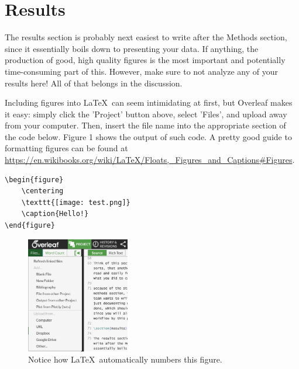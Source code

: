 \documentclass[10pt, letterpaper]{article}
\begin{document}
\section{Results}
The results section is probably next easiest to write after the Methods section, since it essentially boils down to presenting your data. If anything, the production of good, high quality figures is the most important and potentially time-consuming part of this. However, make sure to not analyze any of your results here! All of that belongs in the discussion.

Including figures into \LaTeX\ can seem intimidating at first, but Overleaf makes it easy: simply click the 'Project' button above, select 'Files', and upload away from your computer. Then, insert the file name into the appropriate section of the code below.  Figure 1  shows the output of such code. A pretty good guide to formatting figures can be found at \url{https://en.wikibooks.org/wiki/LaTeX/Floats,_Figures_and_Captions#Figures}. \vspace{1em}

{\scriptsize
\begin{verbatim}
\begin{figure}
    \centering
    \texttt{[image: test.png]}
    \caption{Hello!}
\end{figure}
\end{verbatim}
}

\begin{figure}
  \centering
  \includegraphics[width=0.4\textwidth]{figures/test.png}
  \caption{Notice how \LaTeX\ automatically numbers this figure.}
\end{figure}


\end{document}
